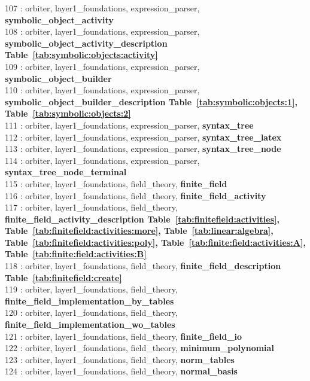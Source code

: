 107 : orbiter, layer1\_foundations, expression\_parser, {\bf symbolic\_object\_activity}\\
108 : orbiter, layer1\_foundations, expression\_parser, {\bf symbolic\_object\_activity\_description Table~\ref{tab:symbolic:objects:activity}}\\
109 : orbiter, layer1\_foundations, expression\_parser, {\bf symbolic\_object\_builder}\\
110 : orbiter, layer1\_foundations, expression\_parser, {\bf symbolic\_object\_builder\_description Table~\ref{tab:symbolic:objects:1},  Table~\ref{tab:symbolic:objects:2}}\\
111 : orbiter, layer1\_foundations, expression\_parser, {\bf syntax\_tree}\\
112 : orbiter, layer1\_foundations, expression\_parser, {\bf syntax\_tree\_latex}\\
113 : orbiter, layer1\_foundations, expression\_parser, {\bf syntax\_tree\_node}\\
114 : orbiter, layer1\_foundations, expression\_parser, {\bf syntax\_tree\_node\_terminal}\\
115 : orbiter, layer1\_foundations, field\_theory, {\bf finite\_field}\\
116 : orbiter, layer1\_foundations, field\_theory, {\bf finite\_field\_activity}\\
117 : orbiter, layer1\_foundations, field\_theory, {\bf finite\_field\_activity\_description Table~\ref{tab:finitefield:activities},  Table~\ref{tab:finitefield:activities:more},  Table~\ref{tab:linear:algebra},  Table~\ref{tab:finitefield:activities:poly},  Table~\ref{tab:finite:field:activities:A},  Table~\ref{tab:finite:field:activities:B}}\\
118 : orbiter, layer1\_foundations, field\_theory, {\bf finite\_field\_description Table~\ref{tab:finitefield:create}}\\
119 : orbiter, layer1\_foundations, field\_theory, {\bf finite\_field\_implementation\_by\_tables}\\
120 : orbiter, layer1\_foundations, field\_theory, {\bf finite\_field\_implementation\_wo\_tables}\\
121 : orbiter, layer1\_foundations, field\_theory, {\bf finite\_field\_io}\\
122 : orbiter, layer1\_foundations, field\_theory, {\bf minimum\_polynomial}\\
123 : orbiter, layer1\_foundations, field\_theory, {\bf norm\_tables}\\
124 : orbiter, layer1\_foundations, field\_theory, {\bf normal\_basis}\\
